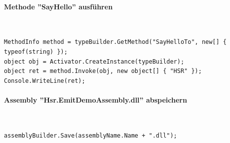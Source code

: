 \documentclass[
a4paper,
oneside,
10pt,
fleqn,
headsepline,
toc=listofnumbered, 
bibliography=totocnumbered]{scrartcl}
\begin{document}
\paragraph{Methode ''SayHello'' ausführen}\mbox{} \\
\begin{lstlisting}
MethodInfo method = typeBuilder.GetMethod("SayHelloTo", new[] { typeof(string) });
object obj = Activator.CreateInstance(typeBuilder);
object ret = method.Invoke(obj, new object[] { "HSR" });
Console.WriteLine(ret);
\end{lstlisting}

\paragraph{Assembly ''Hsr.EmitDemoAssembly.dll'' abspeichern}\mbox{} \\
\begin{lstlisting}
assemblyBuilder.Save(assemblyName.Name + ".dll");
\end{lstlisting}






%
%
\end{document}
